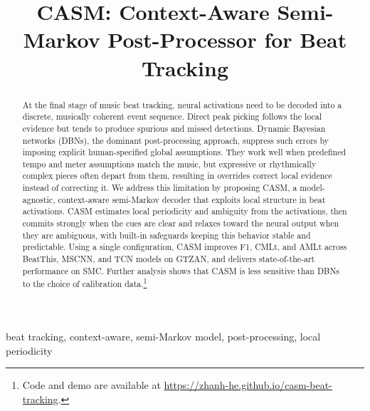\documentclass{article}
\title{CASM: Context-Aware Semi-Markov Post-Processor for Beat Tracking}
\begin{document}
\ninept
\maketitle

\begin{abstract}
At the final stage of music beat tracking, neural activations need to be decoded into a discrete, musically coherent event sequence. Direct peak picking follows the local evidence but tends to produce spurious and missed detections. Dynamic Bayesian networks (DBNs), the dominant post-processing approach, suppress such errors by imposing explicit human-specified global assumptions. They work well when predefined tempo and meter assumptions match the music, but expressive or rhythmically complex pieces often depart from them, resulting in overrides correct local evidence instead of correcting it. We address this limitation by proposing CASM, a model-agnostic, context-aware semi-Markov decoder that exploits local structure in beat activations. CASM estimates local periodicity and ambiguity from the activations, then commits strongly when the cues are clear and relaxes toward the neural output when they are ambiguous, with built-in safeguards keeping this behavior stable and predictable. Using a single configuration, CASM improves F1, CMLt, and AMLt across BeatThis, MSCNN, and TCN models on GTZAN, and delivers state-of-the-art performance on SMC. Further analysis shows that CASM is less sensitive than DBNs to the choice of calibration data.\footnote{Code and demo are available at \url{https://zhanh-he.github.io/casm-beat-tracking}.}
\end{abstract}

\begin{keywords}
beat tracking, context-aware, semi-Markov model, post-processing, local periodicity
\end{keywords}
\end{document}

